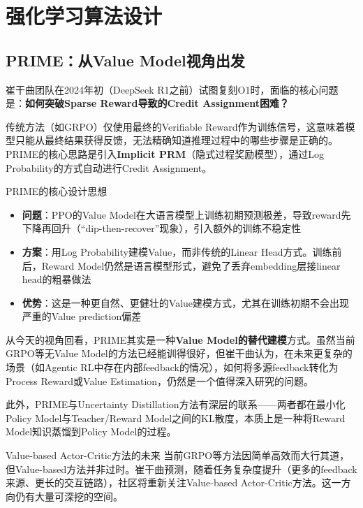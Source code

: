 \section{强化学习算法设计}

\subsection{PRIME：从Value Model视角出发}

崔干曲团队在2024年初（DeepSeek R1之前）试图复刻O1时，面临的核心问题是：\textbf{如何突破Sparse Reward导致的Credit Assignment困难？}

传统方法（如GRPO）仅使用最终的Verifiable Reward作为训练信号，这意味着模型只能从最终结果获得反馈，无法精确知道推理过程中的哪些步骤是正确的。PRIME的核心思路是引入\textbf{Implicit PRM}（隐式过程奖励模型），通过Log Probability的方式自动进行Credit Assignment。

\begin{importantbox}{PRIME的核心设计思想}
\begin{itemize}
    \item \textbf{问题}：PPO的Value Model在大语言模型上训练初期预测极差，导致reward先下降再回升（``dip-then-recover''现象），引入额外的训练不稳定性
    \item \textbf{方案}：用Log Probability建模Value，而非传统的Linear Head方式。训练前后，Reward Model仍然是语言模型形式，避免了丢弃embedding层接linear head的粗暴做法
    \item \textbf{优势}：这是一种更自然、更健壮的Value建模方式，尤其在训练初期不会出现严重的Value prediction偏差
\end{itemize}
\end{importantbox}

从今天的视角回看，PRIME其实是一种\textbf{Value Model的替代建模}方式。虽然当前GRPO等无Value Model的方法已经能训得很好，但崔干曲认为，在未来更复杂的场景（如Agentic RL中存在内部feedback的情况），如何将多源feedback转化为Process Reward或Value Estimation，仍然是一个值得深入研究的问题。

此外，PRIME与Uncertainty Distillation方法有深层的联系——两者都在最小化Policy Model与Teacher/Reward Model之间的KL散度，本质上是一种将Reward Model知识蒸馏到Policy Model的过程。

\begin{knowledgebox}{Value-based Actor-Critic方法的未来}
当前GRPO等方法因简单高效而大行其道，但Value-based方法并非过时。崔干曲预测，随着任务复杂度提升（更多的feedback来源、更长的交互链路），社区将重新关注Value-based Actor-Critic方法。这一方向仍有大量可深挖的空间。
\end{knowledgebox}

